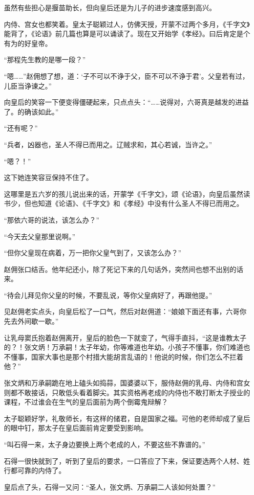 虽然有些担心是揠苗助长，但向皇后还是为儿子的进步速度感到高兴。

内侍、宫女也都笑着。皇太子聪颖过人，仿佛天授，开蒙不过两个多月，《千字文》能背了，《论语》前几篇也算是可以诵读了。现在又开始学《孝经》。曰后肯定是个有为的好皇帝。

“那程先生教的是哪一段？”

“嗯……”赵佣想了想，道：‘子不可以不诤于父，臣不可以不诤于君’。父皇若有过，儿臣当诤谏之。”

向皇后的笑容一下便变得僵硬起来，只点点头：“……说得对，六哥真是越发的进益了。的确该如此。”

“还有呢？”

“兵者，凶器也，圣人不得已而用之。辽贼求和，其心若诚，当许之。”

“嗯？！”

这下她连笑容豆保持不住了。

这哪里是五六岁的孩儿说出来的话，开蒙学《千字文》，颂《论语》，向皇后虽然读书少，但也知道《论语》、《千字文》和《孝经》中没有什么圣人不得已而用之。

“那依六哥的说法，该怎么办？”

“今天去父皇那里说啊。”

“但你父皇现在病着，万一把你父皇气到了，又该怎么办？”

赵佣张口结舌。他年纪还小，除了死记下来的几句话外，突然间也想不出别的话来。

“待会儿拜见你父皇的时候，不要乱说，等你父皇病好了，再跟他提。”

见赵佣老实点头，向皇后松了一口气，然后对赵佣道：“娘娘下面还有事，六哥你先去外间歇一歇。”

让乳母窦氏抱着赵佣离开，皇后的脸色一下就变了，气得手直抖，“这是谁教太子的？！张文炳！万承嗣！太子年幼，你等难道也年幼。小孩子不懂事，你们难道也不懂事，国家大事也是那个村措大能胡言乱语的！他说的时候，你们怎么不拦着他？”

张文炳和万承嗣跪在地上磕头如捣蒜，国婆婆以下，服侍赵佣的乳母、内侍和宫女则都不敢接话，只敢低头看着脚尖。其实资格再老成的内侍也不敢打断太子授业的课程，不过谁会在生气的皇后面前为两个倒霉鬼辩解？

太子聪颖好学，礼敬师长，有这样的储君，自是国家之福。可他的老师却成了皇后的眼中钉，那太子在皇后面前肯定要受到影响。

“叫石得一来，太子身边要换上两个老成的人，不要这些不靠谱的。”

石得一很快就到了，听到了皇后的要求，一口答应了下来，保证要选两个人材、姓行都可靠的内侍了。

皇后点了头，石得一又问：“圣人，张文炳、万承嗣二人该如何处置？”

